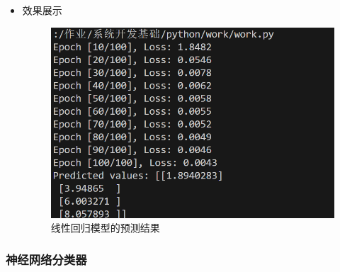\documentclass[UTF8]{ctexart}
\begin{document}
\begin{enumerate}
\begin{itemize}
 
\item 效果展示
  \begin{figure}[H]
    \centering
    \includegraphics[width=\textwidth]{334} %
    \caption{线性回归模型的预测结果} %
  \end{figure}
  \end{itemize}
\end{enumerate}

















\subsubsection{神经网络分类器}
\end{document}

